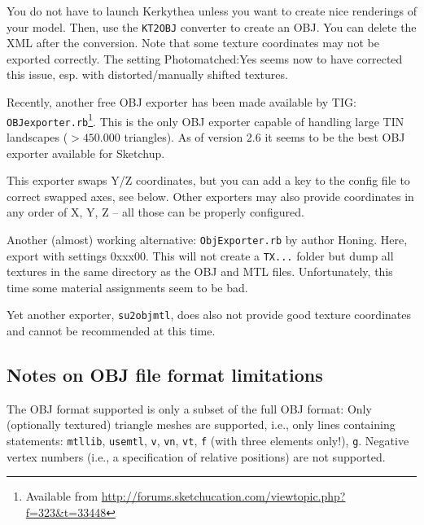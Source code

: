\documentclass[a4paper]{article}
\newcommand{\filename}[1]{\texttt{#1}}
\newcommand{\cmd}[1]{\texttt{#1}}
\begin{document}
You do not have to launch Kerkythea unless you want to create nice renderings of your model. 
Then, use the \filename{KT2OBJ} converter to create an OBJ.  You can delete the XML
after the conversion.  Note that some texture coordinates may not be
exported correctly. The setting Photomatched:Yes seems now to have
corrected this issue, esp. with distorted/manu\-ally shifted textures.

Recently, another free OBJ exporter has been made available by 
TIG: \filename{OBJexporter.rb}\footnote{Available from \url{http://forums.sketchucation.com/viewtopic.php?f=323&t=33448}}. 
This is the only OBJ exporter capable of handling large TIN landscapes ($>450.000$ triangles). 
As of version 2.6 it seems to be the best OBJ exporter available for Sketchup. 


This exporter swaps Y/Z coordinates, but you can add a key to the config
file to correct swapped axes, see below. Other exporters may also
provide coordinates in any order of X, Y, Z -- all those can be
properly configured.

Another (almost) working alternative: \filename{ObjExporter.rb} by author Honing.  Here,
export with settings 0xxx00. This will not create a \filename{TX...} folder but
dump all textures in the same directory as the OBJ and MTL
files. Unfortunately, this time some material assignments seem to be
bad. 

Yet another exporter, \filename{su2objmtl}, does also not provide good texture
coordinates and cannot be recommended at this time.

\subsection{Notes on OBJ file format limitations}
\label{sec:OBJlimitations}

The OBJ format supported is only a subset of the full OBJ format: Only
(optionally textured) triangle meshes are supported, i.e., only lines containing statements:  
\cmd{mtllib}, \cmd{usemtl}, \cmd{v}, \cmd{vn}, \cmd{vt}, \cmd{f} (with three elements only!), \cmd{g}.
Negative vertex numbers (i.e., a specification of relative positions) are not supported.
\end{document}
